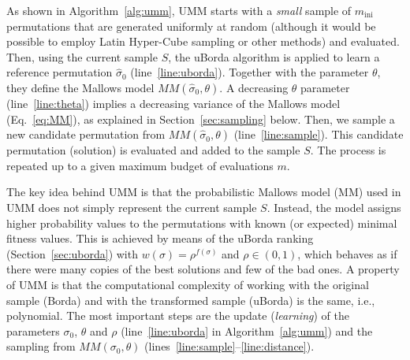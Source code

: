 \documentclass[sigconf,dvipsnames]{acmart}
\newcommand{\minit}{\ensuremath{m_\text{ini}}\xspace}
\newcommand{\FEmax}{\ensuremath{m}}
\begin{document}
As shown in Algorithm~\ref{alg:umm}, UMM  starts with a \emph{small} sample of $\minit$ permutations that are generated uniformly at random  (although it would be possible to employ Latin Hyper-Cube sampling or other methods) and evaluated. Then, using the current sample $S$, the uBorda algorithm is applied to learn a reference permutation $\hat{\sigma}_0$ (line~\ref{line:uborda}). 
Together with the parameter $\theta$, they define the Mallows model $MM(\hat\sigma_0, \theta)$. 
A decreasing $\theta$ parameter (line~\ref{line:theta}) implies a decreasing variance of the Mallows model (Eq.~\ref{eq:MM}), as explained in  Section~\ref{sec:sampling} below. 
Then, we sample a new candidate permutation from  $MM(\hat\sigma_0, \theta)$ (line~\ref{line:sample}). This candidate permutation (solution) is evaluated and added to the sample $S$. The process is repeated up to a given maximum budget of evaluations $\FEmax$.

The key idea behind UMM is that the probabilistic Mallows model (MM) used in
UMM does not simply represent the current sample $S$. Instead, the model
assigns higher probability values to the permutations with known (or expected)
minimal fitness values. This is achieved by means of the uBorda ranking
(Section~\ref{sec:uborda}) with $w(\sigma) = \rho^{f(\sigma)}$ and $\rho \in (0,1)$, which %
behaves as if there were many copies of the best
solutions and few of the bad ones. A property of UMM is that the
computational complexity of working with the original sample (Borda) and with the
transformed sample (uBorda) is the same, i.e., polynomial. The most important steps are the update
(\emph{learning}) of the parameters $\sigma_0$, $\theta$ and $\rho$ (line~\ref{line:uborda} in Algorithm~\ref{alg:umm}) and
the sampling from $MM(\sigma_0,\theta)$ (lines~\ref{line:sample}--\ref{line:distance}). %
\end{document}
